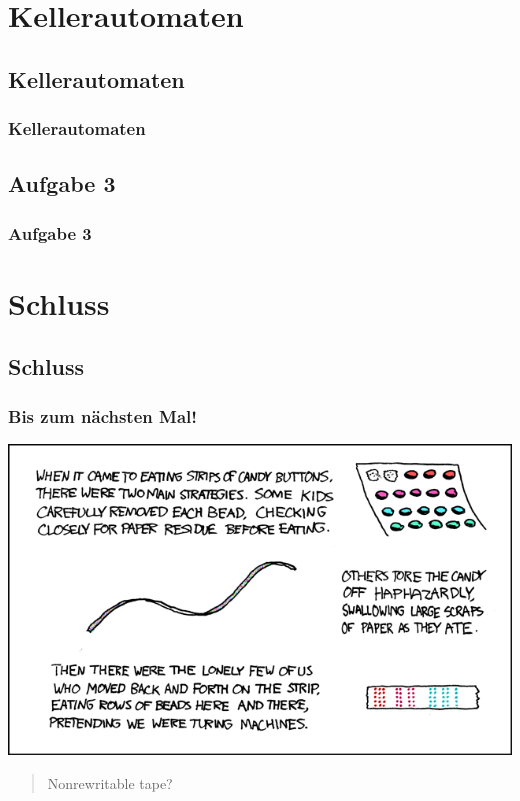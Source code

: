 \section{Kellerautomaten}
\subsection{Kellerautomaten}
\begin{frame}
	\frametitle{Kellerautomaten}
\end{frame}

\subsection{Aufgabe 3}
\begin{frame}
	\frametitle{Aufgabe 3}
\end{frame}

\section{Schluss}
\subsection{Schluss}

\begin{frame}
\frametitle{Bis zum nächsten Mal!}
\begin{center}
  \includegraphics[height=0.8 \textheight]{images/xkcd_205.png} 
\end{center}

\begin{quote}\tiny{Nonrewritable tape?}
\end{quote}
\end{frame}

